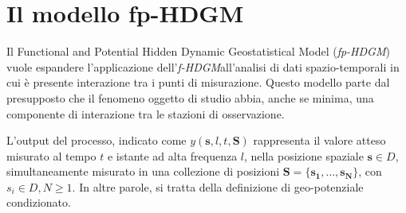 \section[Il modello fp-HDGM]{Il modello fp-HDGM}
Il Functional and Potential Hidden Dynamic Geostatistical Model (\textit{fp-HDGM}) vuole espandere l'applicazione dell'\textit{f-HDGM}all'analisi di dati spazio-temporali in cui è presente interazione tra i punti di misurazione. Questo modello parte dal presupposto che il fenomeno oggetto di studio abbia, anche se minima, una componente di interazione tra le stazioni di osservazione.
\par L'output del processo, indicato come $y(\mathbf{s}, l, t,\mathbf{S})$ rappresenta il valore atteso misurato al tempo $t$ e istante ad alta frequenza $l$, nella posizione spaziale $\mathbf{s} \in D$, simultaneamente misurato in una collezione di posizioni $\mathbf{S} = \{\mathbf{s_1}, \ldots, \mathbf{s_N}\}$,  con $s_i \in D, N \geq 1$. In altre parole, si tratta della definizione di geo-potenziale condizionato.

